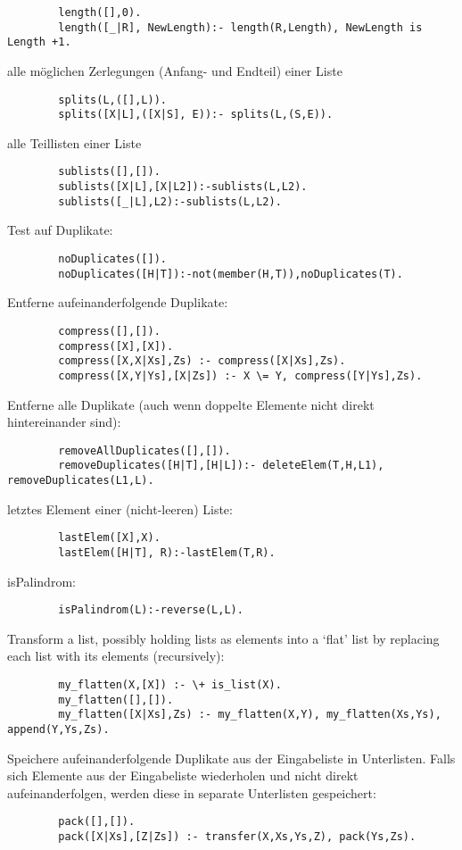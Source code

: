 \begin{compactitem}
		\begin{lstlisting}
		length([],0).
		length([_|R], NewLength):- length(R,Length), NewLength is Length +1.
		\end{lstlisting}	
	\item alle möglichen Zerlegungen (Anfang- und Endteil) einer Liste 
		\begin{lstlisting}
		splits(L,([],L)).
		splits([X|L],([X|S], E)):- splits(L,(S,E)).
		\end{lstlisting}	
	\item alle Teillisten einer Liste
		\begin{lstlisting}
		sublists([],[]).
		sublists([X|L],[X|L2]):-sublists(L,L2).
		sublists([_|L],L2):-sublists(L,L2).
		\end{lstlisting}
	\item Test auf Duplikate:
		\begin{lstlisting}
		noDuplicates([]).
		noDuplicates([H|T]):-not(member(H,T)),noDuplicates(T).
		\end{lstlisting}
	\item Entferne aufeinanderfolgende Duplikate:
		\begin{lstlisting}
		compress([],[]).
		compress([X],[X]).
		compress([X,X|Xs],Zs) :- compress([X|Xs],Zs).
		compress([X,Y|Ys],[X|Zs]) :- X \= Y, compress([Y|Ys],Zs).
		\end{lstlisting}
	\item Entferne alle Duplikate (auch wenn doppelte Elemente nicht direkt hintereinander sind):
		\begin{lstlisting}
		removeAllDuplicates([],[]).
		removeDuplicates([H|T],[H|L]):- deleteElem(T,H,L1), removeDuplicates(L1,L).
		\end{lstlisting}
	\item letztes Element einer (nicht-leeren) Liste:
		\begin{lstlisting}
		lastElem([X],X).
		lastElem([H|T], R):-lastElem(T,R).
		\end{lstlisting}
	\item isPalindrom:
		\begin{lstlisting}
		isPalindrom(L):-reverse(L,L).
		\end{lstlisting}
	\item Transform a list, possibly holding lists as elements into a `flat' list by replacing each list with its elements (recursively):
		\begin{lstlisting}
		my_flatten(X,[X]) :- \+ is_list(X).
		my_flatten([],[]).
		my_flatten([X|Xs],Zs) :- my_flatten(X,Y), my_flatten(Xs,Ys), append(Y,Ys,Zs).
		\end{lstlisting}	
	\item Speichere aufeinanderfolgende Duplikate aus der Eingabeliste in Unterlisten. Falls sich Elemente aus der Eingabeliste wiederholen und nicht direkt aufeinanderfolgen, werden diese in separate Unterlisten gespeichert:
		\begin{lstlisting}
		pack([],[]).
		pack([X|Xs],[Z|Zs]) :- transfer(X,Xs,Ys,Z), pack(Ys,Zs).
		

\end{lstlisting}
\end{compactitem}
